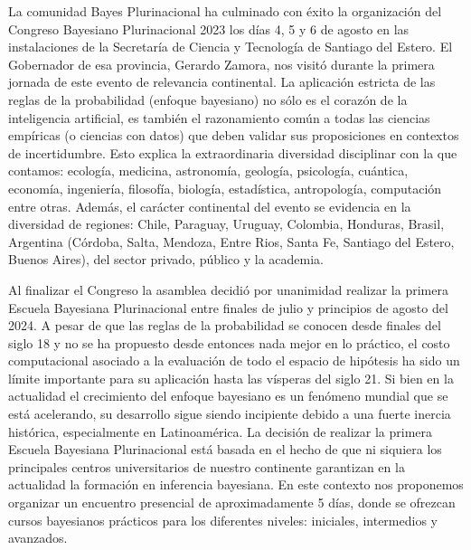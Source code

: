 \documentclass[a4paper,10pt]{letter}
\begin{document}
\begin{letter}
\hspace{1cm}
La comunidad Bayes Plurinacional ha culminado con éxito la organización del Congreso Bayesiano Plurinacional 2023 los días 4, 5 y 6 de agosto en las instalaciones de la Secretaría de Ciencia y Tecnología de Santiago del Estero.
%
El Gobernador de esa provincia, Gerardo Zamora, nos visitó durante la primera jornada de este evento de relevancia continental.
%
La aplicación estricta de las reglas de la probabilidad (enfoque bayesiano) no sólo es el corazón de la inteligencia artificial, es también el razonamiento común a todas las ciencias empíricas (o ciencias con datos) que deben validar sus proposiciones en contextos de incertidumbre.
%
Esto explica la extraordinaria diversidad disciplinar con la que contamos: ecología, medicina, astronomía, geología, psicología, cuántica, economía, ingeniería, filosofía, biología, estadística, antropología, computación entre otras.
%
Además, el carácter continental del evento se evidencia en la diversidad de regiones: Chile, Paraguay, Uruguay, Colombia, Honduras, Brasil, Argentina (Córdoba, Salta, Mendoza, Entre Rios, Santa Fe, Santiago del Estero, Buenos Aires), del sector privado, público y la academia.


\hspace{1cm}
Al finalizar el Congreso la asamblea decidió por unanimidad realizar la primera Escuela Bayesiana Plurinacional entre finales de julio y principios de agosto del 2024.
%
A pesar de que las reglas de la probabilidad se conocen desde finales del siglo 18 y no se ha propuesto desde entonces nada mejor en lo práctico, el costo computacional asociado a la evaluación de todo el espacio de hipótesis ha sido un límite importante para su aplicación hasta las vísperas del siglo 21.
%
Si bien en la actualidad el crecimiento del enfoque bayesiano es un fenómeno mundial que se está acelerando, su desarrollo sigue siendo incipiente debido a una fuerte inercia histórica, especialmente en Latinoamérica.
%
La decisión de realizar la primera Escuela Bayesiana Plurinacional está basada en el hecho de que ni siquiera los principales centros universitarios de nuestro continente garantizan en la actualidad la formación en inferencia bayesiana.
%
En este contexto nos proponemos organizar un encuentro presencial de aproximadamente 5 días, donde se ofrezcan cursos bayesianos prácticos para los diferentes niveles: iniciales, intermedios y avanzados.



\end{letter}
\end{document}
